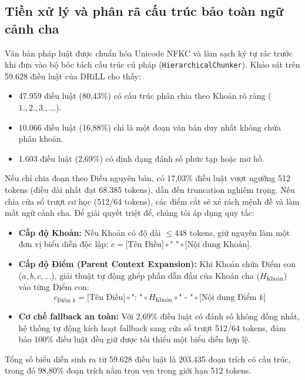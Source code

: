 \documentclass[12pt,a4paper]{article}
\begin{document}
\subsection{Tiền xử lý và phân rã cấu trúc bảo toàn ngữ cảnh cha}
Văn bản pháp luật được chuẩn hóa Unicode NFKC và làm sạch ký tự rác trước khi đưa vào bộ bóc tách cấu trúc cú pháp (\texttt{HierarchicalChunker}). Khảo sát trên 59.628 điều luật của DRiLL cho thấy:
\begin{itemize}[leftmargin=0.7cm]
    \item 47.959 điều luật (80,43\%) có cấu trúc phân chia theo Khoản rõ ràng ($1., 2., 3., \dots$).
    \item 10.066 điều luật (16,88\%) chỉ là một đoạn văn bản duy nhất không chứa phân khoản.
    \item 1.603 điều luật (2,69\%) có định dạng đánh số phức tạp hoặc mơ hồ.
\end{itemize}

Nếu chỉ chia đoạn theo Điều nguyên bản, có 17,03\% điều luật vượt ngưỡng 512 tokens (điều dài nhất đạt 68.385 tokens), dẫn đến truncation nghiêm trọng. Nếu chia cửa sổ trượt cơ học (512/64 tokens), các điểm cắt sẽ xé rách mệnh đề và làm mất ngữ cảnh cha. Để giải quyết triệt để, chúng tôi áp dụng quy tắc:
\begin{itemize}[leftmargin=0.7cm]
    \item \textbf{Cấp độ Khoản:} Nếu Khoản có độ dài $\le 448$ tokens, giữ nguyên làm một đơn vị biểu diễn độc lập: $c = \text{[Tên Điều]} \circ \text{" "} \circ \text{[Nội dung Khoản]}$.
    \item \textbf{Cấp độ Điểm (Parent Context Expansion):} Khi Khoản chứa Điểm con ($a, b, c, \dots$), giải thuật tự động ghép phần dẫn đầu của Khoản cha ($H_{\text{Khoản}}$) vào từng Điểm con:
    \begin{equation}
    c_{\text{Điểm } k} = \text{[Tên Điều]} \circ \text{": "} \circ H_{\text{Khoản}} \circ \text{" - "} \circ \text{[Nội dung Điểm } k\text{]}
    \end{equation}
    \item \textbf{Cơ chế fallback an toàn:} Với 2,69\% điều luật có đánh số không đồng nhất, hệ thống tự động kích hoạt fallback sang cửa sổ trượt 512/64 tokens, đảm bảo 100\% điều luật đều giữ được tối thiểu một biểu diễn hợp lệ.
\end{itemize}
Tổng số biểu diễn sinh ra từ 59.628 điều luật là 203.435 đoạn trích có cấu trúc, trong đó 98,80\% đoạn trích nằm trọn vẹn trong giới hạn 512 tokens.
\end{document}
